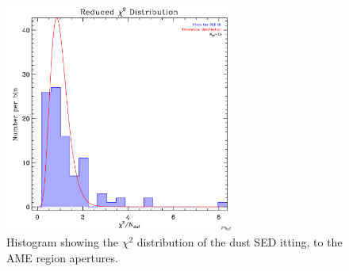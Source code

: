 \documentclass[preprint2,longabstract]{aastex}
\begin{document}
\begin{figure}
\label{fig:AME_regs_chi2}
\includegraphics[width=75mm]{../Plots/histo_chi2red.pdf}
\centering
\caption{Histogram showing the $\chi^{2}$ distribution of the dust SED itting, to the AME region apertures. }
\end{figure}
\end{document}
